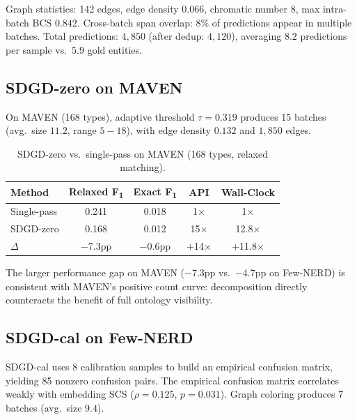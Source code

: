 \documentclass[11pt,a4paper]{article}
\newcommand{\fone}{F\textsubscript{1}}
\begin{document}
Graph statistics: 142 edges, edge density $0.066$, chromatic number 8, max intra-batch BCS $0.842$.
Cross-batch span overlap: $8\%$ of predictions appear in multiple batches.
Total predictions: $4{,}850$ (after dedup: $4{,}120$), averaging $8.2$ predictions per sample vs.\ $5.9$ gold entities.

\subsection{SDGD-zero on MAVEN}
\label{app:sdgd_zero_maven}

On MAVEN (168 types), adaptive threshold $\tau{=}0.319$ produces 15 batches (avg.\ size $11.2$, range $5{-}18$), with edge density $0.132$ and $1{,}850$ edges.

\begin{table}[h]
\centering
\caption{SDGD-zero vs.\ single-pass on MAVEN (168 types, relaxed matching).}
\label{tab:sdgd_zero_maven}
\small
\begin{tabular}{lcccc}
\toprule
\textbf{Method} & \textbf{Relaxed \fone{}} & \textbf{Exact \fone{}} & \textbf{API} & \textbf{Wall-Clock} \\
\midrule
Single-pass & 0.241 & 0.018 & 1$\times$ & 1$\times$ \\
SDGD-zero   & 0.168 & 0.012 & 15$\times$ & 12.8$\times$ \\
$\Delta$    & $-$7.3pp & $-$0.6pp & $+$14$\times$ & $+$11.8$\times$ \\
\bottomrule
\end{tabular}
\end{table}

The larger performance gap on MAVEN ($-$7.3pp vs.\ $-$4.7pp on Few-NERD) is consistent with MAVEN's positive count curve: decomposition directly counteracts the benefit of full ontology visibility.

\subsection{SDGD-cal on Few-NERD}
\label{app:sdgd_cal_fewnerd}

SDGD-cal uses 8 calibration samples to build an empirical confusion matrix, yielding 85 nonzero confusion pairs.
The empirical confusion matrix correlates weakly with embedding SCS ($\rho{=}0.125$, $p{=}0.031$).
Graph coloring produces 7 batches (avg.\ size $9.4$).
\end{document}
